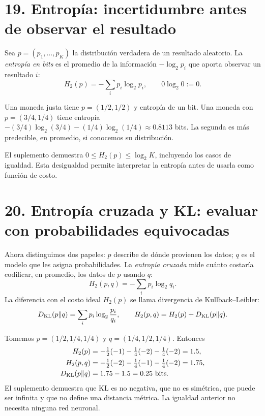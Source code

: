 \section*{19. Entropía: incertidumbre antes de observar el resultado}
Sea $p=(p_1,\ldots,p_K)$ la distribución verdadera de un resultado aleatorio. La \emph{entropía en bits} es el promedio de la información $-\log_2p_i$ que aporta observar un resultado $i$:
\[
H_2(p)=-\sum_i p_i\log_2p_i,\qquad 0\log_2 0:=0.
\]
\begin{ejemplo}
Una moneda justa tiene $p=(1/2,1/2)$ y entropía de un bit. Una moneda con $p=(3/4,1/4)$ tiene entropía
$-(3/4)\log_2(3/4)-(1/4)\log_2(1/4)\approx0.8113$ bits. La segunda es más predecible, en promedio, si conocemos su distribución.
\end{ejemplo}
El suplemento demuestra $0\le H_2(p)\le\log_2K$, incluyendo los casos de igualdad. Esta desigualdad permite interpretar la entropía antes de usarla como función de costo.

\section*{20. Entropía cruzada y KL: evaluar con probabilidades equivocadas}
Ahora distinguimos dos papeles: $p$ describe de dónde provienen los datos; $q$ es el modelo que les asigna probabilidades. La \emph{entropía cruzada} mide cuánto costaría codificar, en promedio, los datos de $p$ usando $q$:
\[
H_2(p,q)=-\sum_i p_i\log_2q_i.
\]
La diferencia con el costo ideal $H_2(p)$ se llama divergencia de Kullback--Leibler:
\[
D_{\rm KL}(p\|q)=\sum_i p_i\log_2\frac{p_i}{q_i},
\qquad H_2(p,q)=H_2(p)+D_{\rm KL}(p\|q).
\]
\begin{ejemplo}
Tomemos $p=(1/2,1/4,1/4)$ y $q=(1/4,1/2,1/4)$. Entonces
\begin{align*}
H_2(p)&=-\tfrac12(-1)-\tfrac14(-2)-\tfrac14(-2)=1.5,\\
H_2(p,q)&=-\tfrac12(-2)-\tfrac14(-1)-\tfrac14(-2)=1.75,\\
D_{\rm KL}(p\|q)&=1.75-1.5=0.25\ \text{bits}.
\end{align*}
El suplemento demuestra que KL es no negativa, que no es simétrica, que puede ser infinita y que no define una distancia métrica. La igualdad anterior no necesita ninguna red neuronal.
\end{ejemplo}

